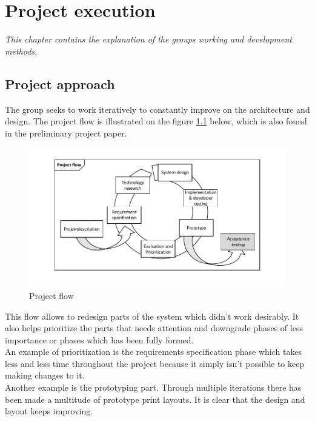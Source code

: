 \chapter{Project execution}
\textit{This chapter contains the explanation of the groups working and development methods.}
\section{Project approach}
The group seeks to work iteratively to constantly improve on the architecture and design. The project flow is illustrated on the figure \ref{fig:projectflow} below, which is also found in the preliminary project paper.
\begin{figure}[hbpt]
	\centering
	\includegraphics[width=1\textwidth]{billeder/9projectexecution/projectflow}
	\caption{Project flow}
	\label{fig:projectflow}
\end{figure}

This flow allows to redesign parts of the system which didn't work desirably. It also helps prioritize the parts that needs attention and downgrade phases of less importance or phases which has been fully formed.\\
An example of prioritization is the requirements specification phase which takes less and less time throughout the project because it simply isn't possible to keep making changes to it.\\
Another example is the prototyping part. Through multiple iterations there has been made a multitude of prototype print layouts. It is clear that the design and layout keeps improving.\\

